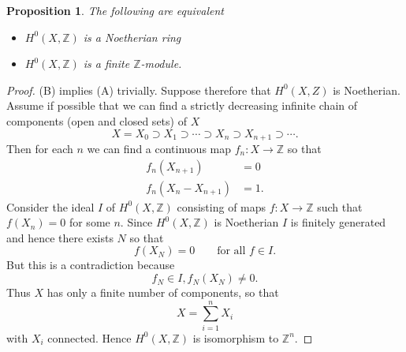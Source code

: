 \documentclass[leqno]{book}
\numberwithin{equation}{section}
\newtheorem{proposition}[theorem]{Proposition}
\theoremstyle{definition}
\begin{document}
            \begin{proposition}
              The following are equivalent
              \begin{itemize}
                \item[(A)] $H^{0}(X,\mathbb{Z})$ is a Noetherian ring
                \item[(B)]  $H^{0}(X,\mathbb{Z})$ is a finite $\mathbb{Z}$-module.
              \end{itemize}
            \end{proposition}

            \begin{proof}
              (B) implies (A) trivially. Suppose therefore that $H^{0}(X,Z)$ is Noetherian. Assume if possible that we can find a strictly decreasing infinite chain of components (open and closed sets) of $X$
              \begin{equation*}
                X=X_0 \supset X_1 \supset \cdots \supset X_{n} \supset X_{n+1} \supset \cdots .
              \end{equation*}
              Then for each $n$ we can find a continuous map $f_{n}:X\to \mathbb{Z}$ so that
              \begin{equation*}
                \begin{aligned}
                f_{n}(X_{n+1}) &= 0 \\
                f_{n}(X_{n}-X_{n+1}) &= 1.
                \end{aligned}
              \end{equation*}
              Consider the ideal $I$ of $H^{0}(X,\mathbb{Z})$ consisting of maps $f:X\to \mathbb{Z}$ such that $f(X_{n})=0$ for some $n$. Since $H^{0}(X,\mathbb{Z})$ is Noetherian $I$ is finitely generated and hence there exists $N$ so that
              \begin{equation*}
                f(X_{N})=0\qquad \text{for all } f\in I.
              \end{equation*}
              But this is a contradiction because
              \begin{equation*}
                f_{N}\in I, f_{N}(X_{N})\neq 0.
              \end{equation*}
              Thus $X$ has only a finite number of components, so that
              \begin{equation*}
                X=\sum_{i=1}^{n}X_{i}
              \end{equation*}
              with $X_{i}$ connected. Hence $H^{0}(X,\mathbb{Z})$ is isomorphism to $\mathbb{Z}^{n}$.
            \end{proof}
\end{document}

